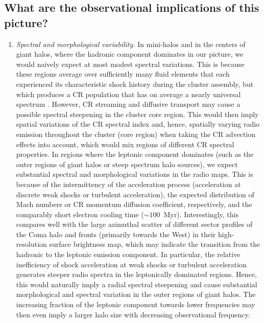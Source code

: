 \documentclass[useAMS,usenatbib]{mn2e}
\begin{document}
\subsection{What are the observational implications of this picture?}

\begin{enumerate}
\item {\em Spectral and morphological variability.} In mini-halos and in the
  centers of giant halos, where the hadronic component dominates in our picture,
  we would naively expect at most modest spectral variations. This is because
  these regions average over sufficiently many fluid elements that each
  experienced its characteristic shock history during the cluster assembly, but
  which produces a CR population that has on average a nearly universal spectrum
  \citep{2010MNRAS.409..449P}. However, CR streaming and diffusive transport may
  cause a possible spectral steepening in the cluster core region. This would
  then imply spatial variations of the CR spectral index and, hence, spatially
  varying radio emission throughout the cluster (core region) when taking the CR
  advection effects into account, which would mix regions of different CR
  spectral properties. In regions where the leptonic component dominates (such
  as the outer regions of giant halos or steep spectrum halo sources), we expect
  substantial spectral and morphological variations in the radio maps. This is
  because of the intermittency of the acceleration process (acceleration at
  discrete weak shocks or turbulent acceleration), the expected distribution of
  Mach numbers or CR momentum diffusion coefficient, respectively, and the
  comparably short electron cooling time ($\sim100$~Myr). Interestingly, this
  compares well with the large azimuthal scatter of different sector profiles of
  the Coma halo \citep[Fig.~4 of][]{2011MNRAS.412....2B} and fronts (primarily
  towards the West) in their high-resolution surface brightness map, which may
  indicate the transition from the hadronic to the leptonic emission
  component. In particular, the relative inefficiency of shock acceleration at
  weak shocks or turbulent acceleration generates steeper radio spectra in the
  leptonically dominated regions. Hence, this would naturally imply a radial
  spectral steepening and cause substantial morphological and spectral variation
  in the outer regions of giant halos. The increasing fraction of the leptonic
  component towards lower frequencies may then even imply a larger halo size
  with decreasing observational frequency.

\end{enumerate}
\end{document}
